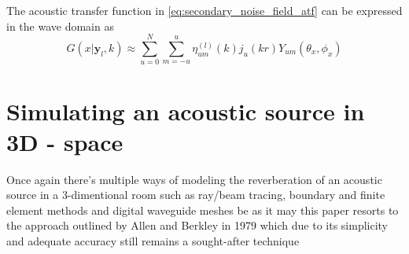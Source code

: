 The acoustic transfer function in \ref{eq:secondary_noise_field_atf} can be expressed in the wave domain as
\begin{equation}
    G(x|\mathbf{y}_l,k) \approx \sum_{u=0}^N \sum_{m=-u}^u\eta^{(l)}_{um}(k)j_u(kr)Y_{um}(\theta_x,\phi_x)
\end{equation}

\section{Simulating an acoustic source in 3D - space}
Once again there's multiple ways of modeling the reverberation of an acoustic source in a 3-dimentional room such as ray/beam tracing, boundary and finite element methods and digital waveguide meshes be as it may this paper resorts to the approach outlined by Allen and Berkley in 1979 which due to its simplicity and adequate accuracy still remains a sought-after technique \cite{Samarasinghe2018}

